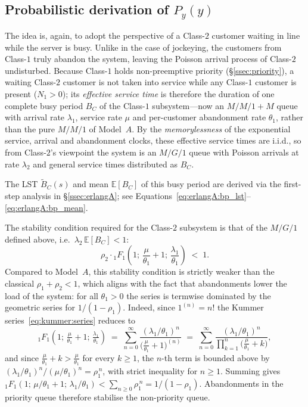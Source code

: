 \subsection{Probabilistic derivation of $P_y(y)$}\label{ssec:C2:prob}

The idea is, again, to adopt the perspective of a Class-$2$ customer waiting in line while the server is busy. Unlike in the case of jockeying, the customers from Class-$1$ truly abandon the system, leaving the Poisson arrival process of Class-$2$ undisturbed. Because Class-$1$ holds non-preemptive priority (\S\ref{ssec:priority}), a waiting Class-$2$ customer is not taken into service while any Class-$1$ customer is present ($N_1>0$); its \emph{effective service time} is therefore the duration of one complete busy period $B_C$ of the Class-$1$ subsystem---now an $M/M/1+M$ queue with arrival rate $\lambda_1$, service rate $\mu$ and per-customer abandonment rate $\theta_1$, rather than the pure $M/M/1$ of Model~$A$. By the \emph{memorylessness} of the exponential service, arrival and abandonment clocks, these effective service times are i.i.d., so from Class-$2$'s viewpoint the system is an $M/G/1$ queue with Poisson arrivals at rate $\lambda_2$ and general service times distributed as $B_C$.

The LST $\widetilde{B}_C(s)$ and mean $\mathbb{E}[B_C]$ of this busy period are derived via the first-step analysis in \S\ref{ssec:erlangA}; see Equations~\eqref{eq:erlangA:bp_lst}--\eqref{eq:erlangA:bp_mean}.

The stability condition required for the Class-$2$ subsystem is that of the $M/G/1$ defined above, i.e.\ $\lambda_2\,\mathbb{E}[B_C]<1$:
\begin{equation}
    \rho_2 \cdot {}_1F_1\!\left(1;\,\frac{\mu}{\theta_1}+1;\,\frac{\lambda_1}{\theta_1}\right) \;<\; 1.
    \label{eq:C2:stability}
\end{equation}
Compared to Model~$A$, this stability condition is strictly weaker than the classical $\rho_1+\rho_2<1$, which aligns with the fact that abandonments lower the load of the system: for all $\theta_1>0$ the series is termwise dominated by the geometric series for $1/(1-\rho_1)$. Indeed, since $1^{(n)}=n!$ the Kummer series~\eqref{eq:kummer:series} reduces to
\[
    {}_1F_1\!\left(1;\,\tfrac{\mu}{\theta_1}+1;\,\tfrac{\lambda_1}{\theta_1}\right)
    \;=\; \sum_{n=0}^{\infty}\frac{(\lambda_1/\theta_1)^n}{\bigl(\tfrac{\mu}{\theta_1}+1\bigr)^{(n)}}
    \;=\; \sum_{n=0}^{\infty}\frac{(\lambda_1/\theta_1)^n}{\prod_{k=1}^{n}\bigl(\tfrac{\mu}{\theta_1}+k\bigr)},
\]
and since $\tfrac{\mu}{\theta_1}+k>\tfrac{\mu}{\theta_1}$ for every $k\ge1$, the $n$-th term is bounded above by $(\lambda_1/\theta_1)^n/(\mu/\theta_1)^n=\rho_1^{\,n}$, with strict inequality for $n\ge1$. Summing gives ${}_1F_1(1;\,\mu/\theta_1+1;\,\lambda_1/\theta_1) < \sum_{n\ge0}\rho_1^{\,n}=1/(1-\rho_1)$. Abandonments in the priority queue therefore stabilise the non-priority queue.

